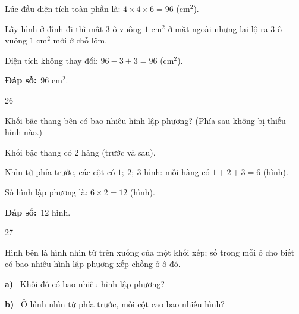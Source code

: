\documentclass[11pt]{article}
\newif\ifsol \solfalse
\providecommand{\AnsWord}{Đáp số}
\newcommand{\dapso}[1]{\par\textbf{\AnsWord:}\ #1}
\newcommand{\probsol}[1]{%
  \begin{lrbox}{\solmeasure}\begin{minipage}{\dimexpr\linewidth-24pt\relax}#1\end{minipage}\end{lrbox}%
  \ifsol
    \begin{solbox}#1\end{solbox}%
  \else
    \setlength{\solht}{\dimexpr\ht\solmeasure+\dp\solmeasure+0.85cm\relax}%
    \ifdim\solht<1.35cm\setlength{\solht}{1.35cm}\fi
    \begin{tcolorbox}[colback=white,colframe=Line,boxrule=0.8pt,arc=5pt,
      left=8pt,right=8pt,top=4pt,bottom=4pt,height=\solht]{\footnotesize\color{Slate}\itshape\WorkWord}\end{tcolorbox}%
  \fi}
\newcommand{\pa}[1]{\textbf{#1)}\ }
\newcommand{\gap}{\vspace{0.3cm}}
\def\WorkWord{Bài làm:}
\def\AnsWord{Đáp số}
\begin{document}
\probsol{
Lúc đầu diện tích toàn phần là: $4\times4\times6=96$ (cm$^2$).\par
Lấy hình ở đỉnh đi thì mất $3$ ô vuông $1$ cm$^2$ ở mặt ngoài nhưng lại lộ ra $3$ ô vuông $1$ cm$^2$ mới ở chỗ lõm.\par
Diện tích không thay đổi: $96-3+3=96$ (cm$^2$).
\dapso{$96$ cm$^2$.}}
\gap
\begin{probbox}{26}{\relax}
\begin{minipage}[t]{0.6\linewidth}
Khối bậc thang bên có bao nhiêu hình lập phương? (Phía sau không bị thiếu hình nào.)
\end{minipage}\hfill
\begin{minipage}[t]{0.36\linewidth}\vspace{0pt}\centering
{}
\end{minipage}
\end{probbox}
\probsol{
Khối bậc thang có $2$ hàng (trước và sau).\par
Nhìn từ phía trước, các cột có $1;\ 2;\ 3$ hình: mỗi hàng có $1+2+3=6$ (hình).\par
Số hình lập phương là: $6\times2=12$ (hình).
\dapso{$12$ hình.}}
\gap
\begin{probbox}{27}{\relax}
\begin{minipage}[t]{0.6\linewidth}
Hình bên là hình nhìn từ trên xuống của một khối xếp; số trong mỗi ô cho biết có bao nhiêu hình lập phương xếp chồng ở ô đó.\par
\pa{a} Khối đó có bao nhiêu hình lập phương?\par
\pa{b} Ở hình nhìn từ phía trước, mỗi cột cao bao nhiêu hình?
\end{minipage}\hfill
\begin{minipage}[t]{0.36\linewidth}\vspace{0pt}\centering
{}
\end{minipage}
\end{probbox}
\end{document}
